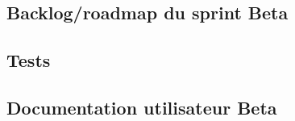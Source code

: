 

\subsection{Backlog/roadmap du sprint Beta}

\subsection{Tests}

\subsection{Documentation utilisateur Beta}